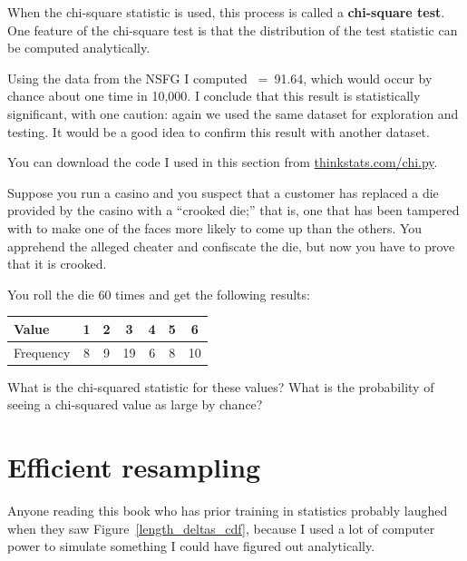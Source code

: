 \documentclass[12pt]{book}
\begin{document}
When the chi-square statistic is used, this process is called a 
{\bf chi-square test}.  One feature of the chi-square test is that
the distribution of the test statistic can be computed analytically.

Using the data from the NSFG I computed \mychi{}~=~91.64, which would
occur by chance about one time in 10,000.  I conclude that this result
is statistically significant, with one caution: again we used the
same dataset for exploration and testing.  It would be a good idea
to confirm this result with another dataset.

You can download the code I used in this section from
\url{thinkstats.com/chi.py}.



\begin{exercise}
Suppose you run a casino and you suspect that a customer has
replaced a die provided by the casino with a ``crooked die;'' that
is, one that has been tampered with to make one of the faces more
likely to come up than the others.  You apprehend the alleged
cheater and confiscate the die, but now you have to prove that it
is crooked.

You roll the die 60 times and get the following results:

\begin{center}
\begin{tabular}{|l|c|c|c|c|c|c|}
\hline
Value     &  1  &  2  &  3  &  4  &  5  &  6  \\ 
\hline
\hline
Frequency &  8  &  9  &  19  &  6  &  8  &  10  \\
\hline
\end{tabular}
\end{center}

What is the chi-squared statistic for these values?  What is the
probability of seeing a chi-squared value as large by chance?

\end{exercise}




\section{Efficient resampling}

Anyone reading this book who has prior training in statistics probably
laughed when they saw Figure~\ref{length_deltas_cdf}, because I used a
lot of computer power to simulate something I could have figured out
analytically.
\end{document}
